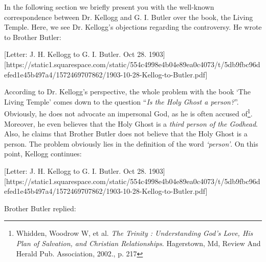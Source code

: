 In the following section we briefly present you with the well-known correspondence between Dr. Kellogg and G. I. Butler over the book, the Living Temple. Here, we see Dr. Kellogg’s objections regarding the controversy. He wrote to Brother Butler:

[Letter: J. H. Kellogg to G. I. Butler. Oct 28. 1903][https://static1.squarespace.com/static/554c4998e4b04e89ea0c4073/t/5db9fbc96defed1e45b497a4/1572469707862/1903-10-28-Kellog-to-Butler.pdf]

According to Dr. Kellogg’s perspective, the whole problem with the book ‘The Living Temple’ comes down to the question “\textit{Is the Holy Ghost a person?}”. Obviously, he does not advocate an impersonal God, as he is often accused of\footnote{Whidden, Woodrow W, et al. \textit{The Trinity : Understanding God's Love, His Plan of Salvation, and Christian Relationships}. Hagerstown, Md, Review And Herald Pub. Association, 2002., p. 217}. Moreover, he even believes that the Holy Ghost is a \textit{third person of the Godhead}. Also, he claims that Brother Butler does not believe that the Holy Ghost is a person. The problem obviously lies in the definition of the word \textit{‘person’}. On this point, Kellogg continues:

[Letter: J. H. Kellogg to G. I. Butler. Oct 28. 1903][https://static1.squarespace.com/static/554c4998e4b04e89ea0c4073/t/5db9fbc96defed1e45b497a4/1572469707862/1903-10-28-Kellog-to-Butler.pdf]

Brother Butler replied:

